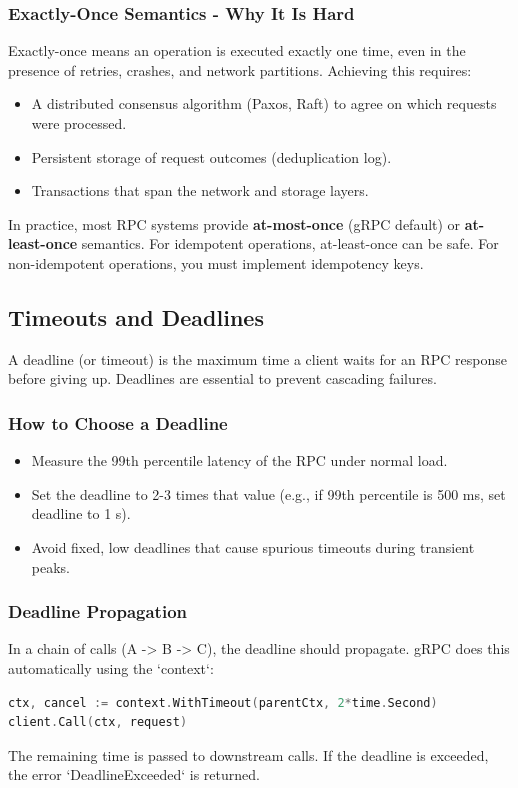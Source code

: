 \documentclass[a4paper]{article}
\begin{document}
\subsubsection{Exactly-Once Semantics - Why It Is Hard}
Exactly-once means an operation is executed exactly one time, even in the presence of retries, crashes, and network partitions. Achieving this requires:
\begin{itemize}
    \item A distributed consensus algorithm (Paxos, Raft) to agree on which requests were processed.
    \item Persistent storage of request outcomes (deduplication log).
    \item Transactions that span the network and storage layers.
\end{itemize}
In practice, most RPC systems provide \textbf{at-most-once} (gRPC default) or \textbf{at-least-once} semantics. For idempotent operations, at-least-once can be safe. For non-idempotent operations, you must implement idempotency keys.

\subsection{Timeouts and Deadlines}
A deadline (or timeout) is the maximum time a client waits for an RPC response before giving up. Deadlines are essential to prevent cascading failures.

\subsubsection{How to Choose a Deadline}
\begin{itemize}
    \item Measure the 99th percentile latency of the RPC under normal load.
    \item Set the deadline to 2-3 times that value (e.g., if 99th percentile is 500 ms, set deadline to 1 s).
    \item Avoid fixed, low deadlines that cause spurious timeouts during transient peaks.
\end{itemize}

\subsubsection{Deadline Propagation}
In a chain of calls (A -> B -> C), the deadline should propagate. gRPC does this automatically using the `context`:
\begin{lstlisting}[language=Go]
ctx, cancel := context.WithTimeout(parentCtx, 2*time.Second)
client.Call(ctx, request)
\end{lstlisting}
The remaining time is passed to downstream calls. If the deadline is exceeded, the error `DeadlineExceeded` is returned.
\end{document}
